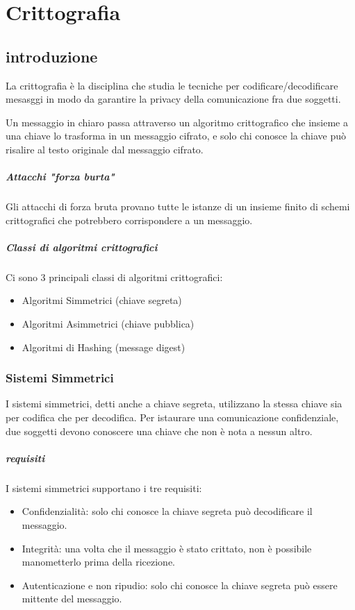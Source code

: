 \chapter{Crittografia}
\section{introduzione}
La crittografia è la disciplina che studia le tecniche per codificare/decodificare mesasggi in modo da garantire la privacy della comunicazione fra due soggetti.

Un messaggio in chiaro passa attraverso un algoritmo crittografico che insieme a una chiave 
lo trasforma in un messaggio cifrato, e solo chi conosce la chiave può risalire al testo originale dal messaggio cifrato.

\paragraph*{Attacchi "forza burta"}
Gli attacchi di forza bruta provano tutte le istanze di un insieme finito di schemi crittografici che potrebbero corrispondere a un messaggio.

\paragraph{Classi di algoritmi crittografici}
Ci sono 3 principali classi di algoritmi crittografici:
\begin{itemize}
    \item Algoritmi Simmetrici (chiave segreta)
    \item Algoritmi Asimmetrici (chiave pubblica)
    \item Algoritmi di Hashing (message digest)
\end{itemize}

\subsection{Sistemi Simmetrici}
I sistemi simmetrici, detti anche a chiave segreta, utilizzano la stessa chiave sia per codifica che per decodifica.
Per istaurare una comunicazione confidenziale, due soggetti devono conoscere una chiave che non è nota a nessun altro.

\paragraph{requisiti}
I sistemi simmetrici supportano i tre requisiti:
\begin{itemize}
    \item Confidenzialità: solo chi conosce la chiave segreta può decodificare il messaggio.
    \item Integrità: una volta che il messaggio è stato crittato, non è possibile manometterlo prima della ricezione.
    \item Autenticazione e non ripudio: solo chi conosce la chiave segreta può essere mittente del messaggio.
\end{itemize}

